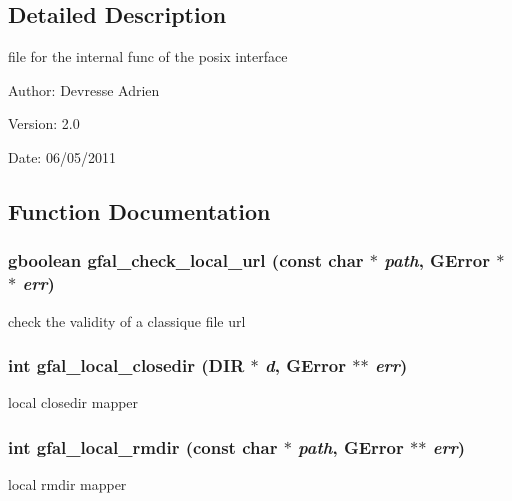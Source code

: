 \subsection{Detailed Description}
file for the internal func of the posix interface 

\begin{Desc}
\item[Author:]Devresse Adrien \end{Desc}
\begin{Desc}
\item[Version:]2.0 \end{Desc}
\begin{Desc}
\item[Date:]06/05/2011 \end{Desc}


\subsection{Function Documentation}
\subsubsection{\setlength{\rightskip}{0pt plus 5cm}gboolean gfal\_\-check\_\-local\_\-url (const char $\ast$ {\em path}, GError $\ast$$\ast$ {\em err})}\label{gfal__posix__local__file_8c_02987ce8beeb908c36ee3d4ef3bc5618}


check the validity of a classique file url 
\subsubsection{\setlength{\rightskip}{0pt plus 5cm}int gfal\_\-local\_\-closedir (DIR $\ast$ {\em d}, GError $\ast$$\ast$ {\em err})}\label{gfal__posix__local__file_8c_48c8b58b85db67426dbaf28fb4080ff0}


local closedir mapper 
\subsubsection{\setlength{\rightskip}{0pt plus 5cm}int gfal\_\-local\_\-rmdir (const char $\ast$ {\em path}, GError $\ast$$\ast$ {\em err})}\label{gfal__posix__local__file_8c_a89a8db8cb79bf7c575b08305704c248}


local rmdir mapper 